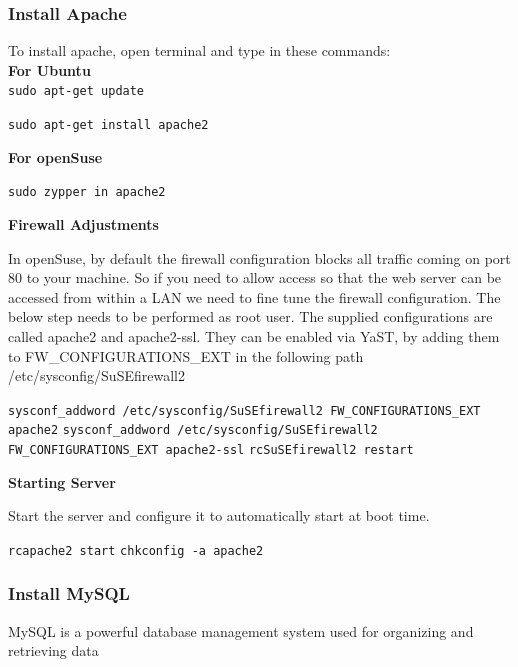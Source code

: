 \documentclass[16pt]{article}
\begin{document}
  \subsubsection{Install Apache}
  
  \hfill

  To install apache, open terminal and type in these commands: \\
  \textbf{For Ubuntu} \\
  \texttt{sudo apt-get update} 

  \texttt{sudo apt-get install apache2}

  \textbf{For openSuse}

  \texttt{sudo zypper in apache2}

  \textbf{Firewall Adjustments}

  In openSuse, by default the firewall configuration blocks all traffic
  coming on port 80 to your machine. So if you need to allow access so
  that the web server can be accessed from within a LAN we need to fine
  tune the firewall configuration. The below step needs to be performed as
  root user. The supplied configurations are called apache2 and
  apache2-ssl. They can be enabled via YaST, by adding them to
  FW\_CONFIGURATIONS\_EXT in the following path /etc/sysconfig/SuSEfirewall2
  
  \vspace{0.5cm}

  \texttt{sysconf\_addword /etc/sysconfig/SuSEfirewall2 FW\_CONFIGURATIONS\_EXT apache2}
  \texttt{sysconf\_addword /etc/sysconfig/SuSEfirewall2 FW\_CONFIGURATIONS\_EXT apache2-ssl}
  \texttt{rcSuSEfirewall2 restart}
  
   \vspace{0.5cm}

  \textbf{Starting Server}

  Start the server and configure it to automatically start at boot time.

  \texttt{rcapache2 start} \texttt{chkconfig -a apache2}
  
   \vspace{0.5cm}

  \subsubsection{Install MySQL}
  
   \vspace{0.5cm}

  MySQL is a powerful database management system used for organizing and
  retrieving data
\end{document}
